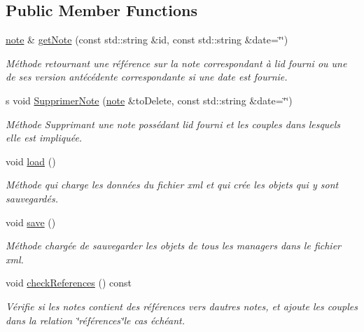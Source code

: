 \subsection*{Public Member Functions}
\begin{DoxyCompactItemize}
\item 
\hyperlink{classnote}{note} \& \hyperlink{class_notes_manager2_a53819d123894c31bbbab66b3d0bf0ff0}{get\+Note} (const std\+::string \&id, const std\+::string \&date=\char`\"{}\char`\"{})
\begin{DoxyCompactList}\small\item\em Méthode retournant une référence sur la note correspondant à l\textquotesingle{}id fourni ou une de ses version antécédente correspondante si une date est fournie. \end{DoxyCompactList}\item 
s void \hyperlink{class_notes_manager2_ac020f8488f0f71f92de1e8131a64d943}{Supprimer\+Note} (\hyperlink{classnote}{note} \&to\+Delete, const std\+::string \&date=\char`\"{}\char`\"{})
\begin{DoxyCompactList}\small\item\em Méthode Supprimant une note possédant l\textquotesingle{}id fourni et les couples dans lesquels elle est impliquée. \end{DoxyCompactList}\item 
void \hyperlink{class_notes_manager2_a2248b5b1620b2039fdba9b3c6476c6cc}{load} ()
\begin{DoxyCompactList}\small\item\em Méthode qui charge les données du fichier xml et qui crée les objets qui y sont sauvegardés. \end{DoxyCompactList}\item 
void \hyperlink{class_notes_manager2_a03224a8a150d7d7a40a6633ab2afc7c0}{save} ()
\begin{DoxyCompactList}\small\item\em Méthode chargée de sauvegarder les objets de tous les managers dans le fichier xml. \end{DoxyCompactList}\item 
\mbox{\label{class_notes_manager2_a41ec18388f556565d78794ae042511b2}} 
void \hyperlink{class_notes_manager2_a41ec18388f556565d78794ae042511b2}{check\+References} () const
\begin{DoxyCompactList}\small\item\em Vérifie si les notes contient des références vers d\textquotesingle{}autres notes, et ajoute les couples dans la relation \char`\"{}références\char`\"{}le cas échéant. \end{DoxyCompactList}\end{DoxyCompactItemize}
